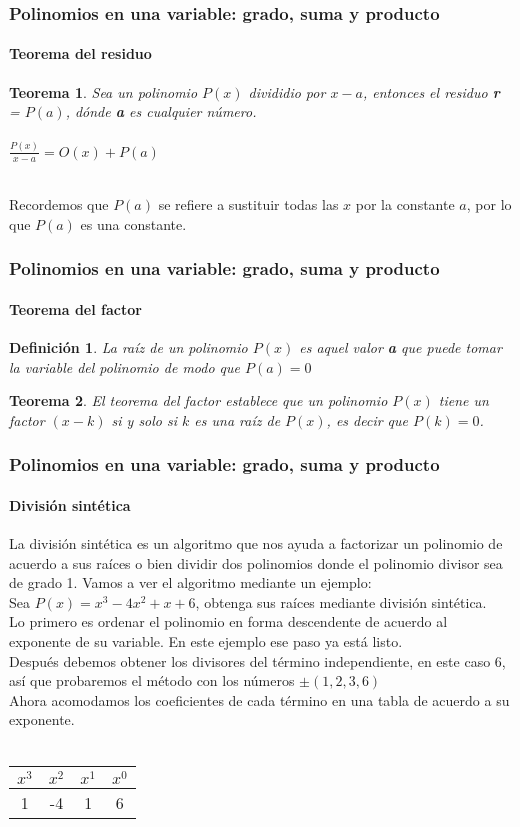 \documentclass[11pt]{beamer}
\newtheorem{defi}{Definición}
\newtheorem{teor}{Teorema}
\begin{document}
\begin{frame}
\frametitle{Polinomios en una variable: grado, suma y producto}
\framesubtitle{Teorema del residuo}
\begin{teor}
Sea un polinomio $P(x)$ divididio por $x-a$, entonces el residuo \textbf{r} = $P(a)$, dónde \textbf{a} es cualquier número.\\ \hspace{0cm} \\
$\frac{P(x)}{x-a} = O(x) + P(a)$\\ \hspace{0cm} \\
\end{teor}
Recordemos que $P(a)$ se refiere a sustituir todas las $x$ por la constante $a$, por lo que $P(a)$ es una constante.
\end{frame}

\begin{frame}
\frametitle{Polinomios en una variable: grado, suma y producto}
\framesubtitle{Teorema del factor}
\begin{defi}
La raíz de un polinomio $P(x)$ es aquel valor \textbf{a} que puede tomar la variable del polinomio de modo que $P(a) = 0$
\end{defi}
\begin{teor}
El teorema del factor establece que un polinomio $P(x)$ tiene un factor $(x-k)$ si y solo si $k$ es una raíz de $P(x)$, es decir que $P(k) = 0$.
\end{teor}
\end{frame}

\begin{frame}
\frametitle{Polinomios en una variable: grado, suma y producto}
\framesubtitle{División sintética}
La división sintética es un algoritmo que nos ayuda a factorizar un polinomio de acuerdo a sus raíces o bien dividir  dos polinomios donde el polinomio divisor sea de grado 1. Vamos a ver el algoritmo mediante un ejemplo: \\
Sea $P(x) = x^3 - 4x^2 + x + 6$, obtenga sus raíces mediante división sintética.\\
Lo primero es ordenar el polinomio en forma descendente de acuerdo al exponente de su variable. En este ejemplo ese paso ya está listo.\\ 

Después debemos obtener los divisores del término independiente, en este caso 6, así que probaremos el método con los números
$\pm (1,2,3,6)$\\
Ahora acomodamos los coeficientes de cada término en una tabla de acuerdo a su exponente.\\ \hspace{0cm} \\
\begin{tabular}{c|c|c|c|}
$x^3$ & $x^2$ & $x^1$ & $x^0$\\ \hline
1 & -4 & 1 & 6 \\ \hline
\end{tabular}
\end{frame}
\end{document}
